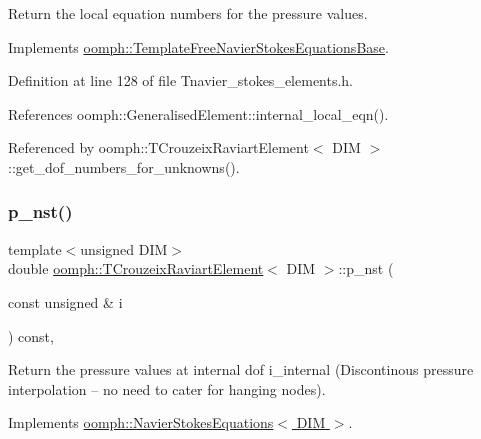 Return the local equation numbers for the pressure values. 



Implements \hyperlink{classoomph_1_1TemplateFreeNavierStokesEquationsBase_a4e84f2f4260a0e65201cbb19fd63b398}{oomph\+::\+Template\+Free\+Navier\+Stokes\+Equations\+Base}.



Definition at line 128 of file Tnavier\+\_\+stokes\+\_\+elements.\+h.



References oomph\+::\+Generalised\+Element\+::internal\+\_\+local\+\_\+eqn().



Referenced by oomph\+::\+T\+Crouzeix\+Raviart\+Element$<$ D\+I\+M $>$\+::get\+\_\+dof\+\_\+numbers\+\_\+for\+\_\+unknowns().

\mbox{\label{classoomph_1_1TCrouzeixRaviartElement_a4d3fd2e4d1da1daa9cf53bad6495040e}} 
\subsubsection{\texorpdfstring{p\+\_\+nst()}{p\_nst()}\hspace{0.1cm}{\footnotesize\ttfamily [1/2]}}
{\footnotesize\ttfamily template$<$unsigned D\+IM$>$ \\
double \hyperlink{classoomph_1_1TCrouzeixRaviartElement}{oomph\+::\+T\+Crouzeix\+Raviart\+Element}$<$ D\+IM $>$\+::p\+\_\+nst (\begin{DoxyParamCaption}\item[{const unsigned \&}]{i }\end{DoxyParamCaption}) const\hspace{0.3cm}{\ttfamily [inline]}, {\ttfamily [virtual]}}



Return the pressure values at internal dof i\+\_\+internal (Discontinous pressure interpolation -- no need to cater for hanging nodes). 



Implements \hyperlink{classoomph_1_1NavierStokesEquations_ae00a22f99df3630b3ab751a4453a7fd8}{oomph\+::\+Navier\+Stokes\+Equations$<$ D\+I\+M $>$}.



